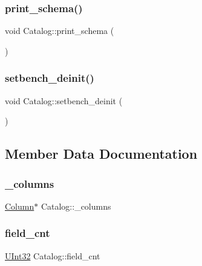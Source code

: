 \subsubsection{\texorpdfstring{print\+\_\+schema()}{print\_schema()}}
{\footnotesize\ttfamily void Catalog\+::print\+\_\+schema (\begin{DoxyParamCaption}{ }\end{DoxyParamCaption})}

\mbox{\label{classCatalog_aca79c0260b48603b70619e5e91187611}} 
\subsubsection{\texorpdfstring{setbench\+\_\+deinit()}{setbench\_deinit()}}
{\footnotesize\ttfamily void Catalog\+::setbench\+\_\+deinit (\begin{DoxyParamCaption}{ }\end{DoxyParamCaption})}



\subsection{Member Data Documentation}
\mbox{\label{classCatalog_ae629f8b429ce660192d3dd2e51f493ea}} 
\subsubsection{\texorpdfstring{\+\_\+columns}{\_columns}}
{\footnotesize\ttfamily \hyperlink{classColumn}{Column}$\ast$ Catalog\+::\+\_\+columns}

\mbox{\label{classCatalog_abd9d27040300ad689ec3b21b46d78d44}} 
\subsubsection{\texorpdfstring{field\+\_\+cnt}{field\_cnt}}
{\footnotesize\ttfamily \hyperlink{global_8h_a7e8aeec7b6541935dfc6f608cd5170ce}{U\+Int32} Catalog\+::field\+\_\+cnt}

